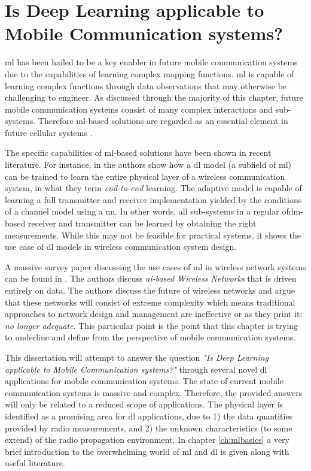 \section{Is Deep Learning applicable to Mobile Communication systems?}
\gls{ml} has been hailed to be a key enabler in future mobile communication systems due to the capabilities of learning complex mapping functions. \gls{ml} is capable of learning complex functions through data observations that may otherwise be challenging to engineer. As discussed through the majority of this chapter, future mobile communication systems consist of many complex interactions and sub-systems. Therefore \gls{ml}-based solutions are regarded as an essential element in future cellular systems \cite{Li2017IntelligentIntelligence, Klaine2017ANetworks}. 
 
The specific capabilities of \gls{ml}-based solutions have been shown in recent literature. For instance, in \cite{OShea2017, Dorner2018, Aoudia2018} the authors show how a \gls{dl} model (a subfield of \gls{ml}) can be trained to learn the entire physical layer of a wireless communication system, in what they term \emph{end-to-end} learning. The adaptive model is capable of learning a full transmitter and receiver implementation yielded by the conditions of a channel model using a \gls{nn}. In other words, all sub-systems in a regular \gls{ofdm}-based receiver and transmitter can be learned by obtaining the right measurements. While this may not be feasible for practical systems, it shows the use case of \gls{dl} models in wireless communication system design.


A massive survey paper discussing the use cases of \gls{ml} in wireless network systems can be found in \cite{Zappone2019}. The authors discuss \emph{\gls{ai}-based Wireless Networks} that is driven entirely on data. The authors discuss the future of wireless networks and argue that these networks will consist of extreme complexity which means traditional approaches to network design and management are ineffective or as they print it: \emph{no longer adequate}. This particular point is the point that this chapter is trying to underline and define from the perspective of mobile communication systems. 


This dissertation will attempt to answer the question \emph{"Is Deep Learning applicable to Mobile Communication systems?"} through several novel \gls{dl} applications for mobile communication systems. The state of current mobile communication systems is massive and complex. Therefore, the provided answers will only be related to a reduced scope of applications. The physical layer is identified as a promising area for \gls{dl} applications, due to 1) the data quantities provided by radio measurements, and 2) the unknown characteristics (to some extend) of the radio propagation environment.  In chapter \ref{ch:mlbasics} a very brief introduction to the overwhelming world of \gls{ml} and \gls{dl} is given along with useful literature. 